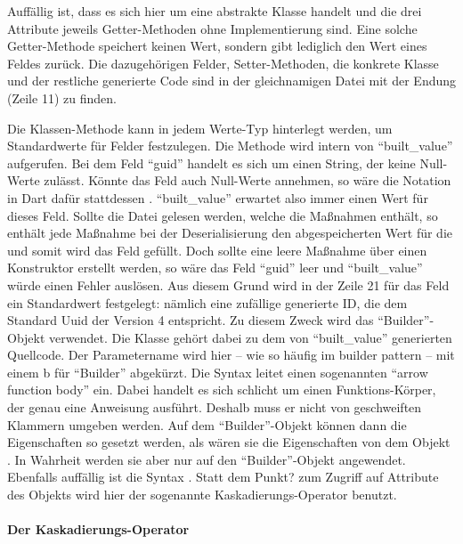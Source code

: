 Auffällig ist, dass es sich hier um eine abstrakte Klasse handelt und die drei Attribute jeweils Getter-Methoden ohne Implementierung sind.
Eine solche Getter-Methode speichert keinen Wert, sondern gibt lediglich den Wert eines Feldes zurück.
Die dazugehörigen Felder,  Setter-Methoden, die konkrete Klasse und der restliche generierte Code sind in der gleichnamigen Datei mit der Endung  (Zeile 11) zu finden.

Die Klassen-Methode  kann in jedem Werte-Typ hinterlegt werden, um Standardwerte für Felder festzulegen.
Die Methode wird intern von \enquote{built_value} aufgerufen.
Bei dem Feld \enquote{guid} handelt es sich um einen String, der keine Null-Werte zulässt.
Könnte das Feld auch Null-Werte annehmen, so wäre die Notation in Dart dafür stattdessen . \enquote{built_value} erwartet also immer einen Wert für dieses Feld. Sollte die Datei gelesen werden, welche die Maßnahmen enthält, so enthält jede Maßnahme bei der Deserialisierung den abgespeicherten Wert für die  und somit wird das Feld gefüllt. Doch sollte eine leere Maßnahme über einen Konstruktor erstellt werden, so wäre das Feld \enquote{guid} leer und \enquote{built_value} würde einen Fehler auslösen. Aus diesem Grund wird in der Zeile 21 für das Feld  ein Standardwert festgelegt: nämlich eine zufällige generierte ID, die dem Standard Uuid der Version 4 entspricht.
Zu diesem Zweck wird das \enquote{Builder}-Objekt verwendet.
Die Klasse  gehört dabei zu dem von \enquote{built_value} generierten Quellcode.
Der Parametername wird hier – wie so häufig im builder pattern – mit einem b für \enquote{Builder} abgekürzt.
Die Syntax \IC{=>} leitet  einen sogenannten \enquote{arrow function body} ein.
Dabei handelt es sich schlicht um einen Funktions-Körper, der genau eine Anweisung ausführt. Deshalb muss er nicht von geschweiften Klammern umgeben werden.
Auf dem \enquote{Builder}-Objekt können dann die Eigenschaften so gesetzt werden, als wären sie die Eigenschaften von dem Objekt .
In Wahrheit werden sie aber nur auf den \enquote{Builder}-Objekt angewendet.  Ebenfalls auffällig ist die Syntax .  Statt dem Punkt? zum Zugriff auf Attribute des Objekts wird hier der sogenannte Kaskadierungs-Operator benutzt.

\paragraph{Der Kaskadierungs-Operator}

